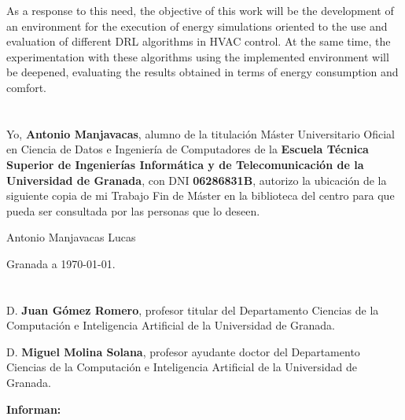As a response to this need, the objective of this work will be the development of an environment for the execution of energy simulations oriented to the use and evaluation of different DRL algorithms in HVAC control. At the same time, the experimentation with these algorithms using the implemented environment will be deepened, evaluating the results obtained in terms of energy consumption and comfort.

\chapter*{}
\thispagestyle{empty}

Yo, \textbf{Antonio Manjavacas}, alumno de la titulación Máster Universitario Oficial en Ciencia de Datos e Ingeniería de Computadores de la \textbf{Escuela Técnica Superior
de Ingenierías Informática y de Telecomunicación de la Universidad de Granada}, con DNI \textbf{06286831B}, autorizo la ubicación de la siguiente copia de mi Trabajo Fin de Máster en la biblioteca del centro para que pueda ser
consultada por las personas que lo deseen.

\vspace{6cm}

\begin{center}
    \noindent Antonio Manjavacas Lucas
\end{center}

\vspace{2cm}

\begin{flushright}
Granada a \today .
\end{flushright}

\chapter*{}
\thispagestyle{empty}

D. \textbf{Juan Gómez Romero}, profesor titular del Departamento Ciencias de la Computación e Inteligencia Artificial de la Universidad de Granada.

\vspace{0.5cm}

D. \textbf{Miguel Molina Solana}, profesor ayudante doctor del Departamento Ciencias de la Computación e Inteligencia Artificial de la Universidad de Granada.

\vspace{0.5cm}

\textbf{Informan:}

\vspace{0.5cm}

